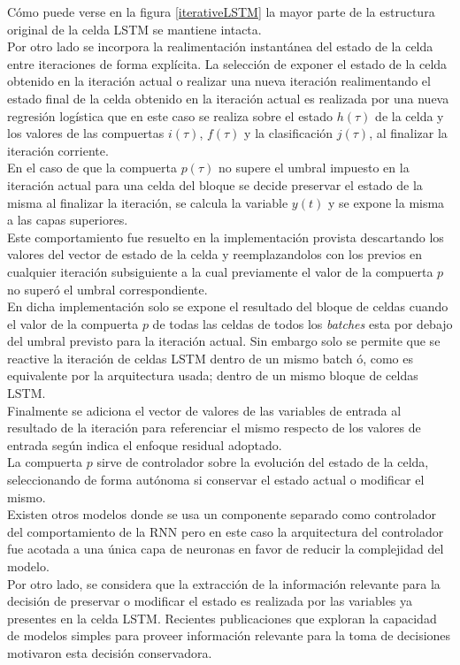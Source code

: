 \documentclass{article}
\begin{document}
	Cómo puede verse en la figura \ref{iterativeLSTM} la mayor parte de la estructura original de la celda LSTM se mantiene intacta. \\
	Por otro lado se incorpora la realimentación instantánea del estado de la celda entre iteraciones de forma explícita. La selección de exponer el estado de la celda obtenido en la iteración actual o realizar una nueva iteración realimentando el estado final de la celda obtenido en la iteración actual es realizada por una nueva regresión logística que en este caso se realiza sobre el estado $h(\tau)$ de la celda y los valores de las compuertas $i(\tau)$, $f(\tau)$ y la clasificación $j(\tau)$, al finalizar la iteración corriente.\\
	En el caso de que la compuerta $p(\tau)$ no supere el umbral impuesto en la iteración actual para una celda del bloque se decide preservar el estado de la misma al finalizar la iteración, se calcula la variable $y(t)$ y se expone la misma a las capas superiores.\\
	Este comportamiento fue resuelto en la implementación provista descartando los valores del vector de estado de la celda y reemplazandolos con los previos en cualquier iteración subsiguiente a la cual previamente el valor de la compuerta $p$ no superó el umbral correspondiente.\\
	En dicha implementación solo se expone el resultado del bloque de celdas cuando el valor de la compuerta $p$ de todas las celdas de todos los \textit{batches} esta por debajo del umbral previsto para la iteración actual. Sin embargo solo se permite que se reactive la iteración de celdas LSTM dentro de un mismo batch ó, como es equivalente por la arquitectura usada; dentro de un mismo bloque de celdas LSTM.\\
	Finalmente se adiciona el vector de valores de las variables de entrada al resultado de la iteración para referenciar el mismo respecto de los valores de entrada según indica el enfoque residual adoptado\cite{28ResidualLearning}.\\
	
	La compuerta $p$ sirve de controlador sobre la evolución del estado de la celda, seleccionando de forma autónoma si conservar el estado actual o modificar el mismo.\\
	Existen otros modelos donde se usa un componente separado como controlador del comportamiento de la RNN\cite{18DifferentiableNeuralComputer, 30NeuralTuringMachines, 31NeuralTuringMachinesRevised} pero en este caso la arquitectura del controlador fue acotada a una única capa de neuronas en favor de reducir la complejidad del modelo. \\
	Por otro lado, se considera que la extracción de la información relevante para la decisión de preservar o modificar el estado es realizada por las variables ya presentes en la celda LSTM. Recientes publicaciones que exploran la capacidad de modelos simples para proveer información relevante para la toma de decisiones motivaron esta decisión conservadora\cite{32WideDeepLearning}.\\
	
\end{document}
